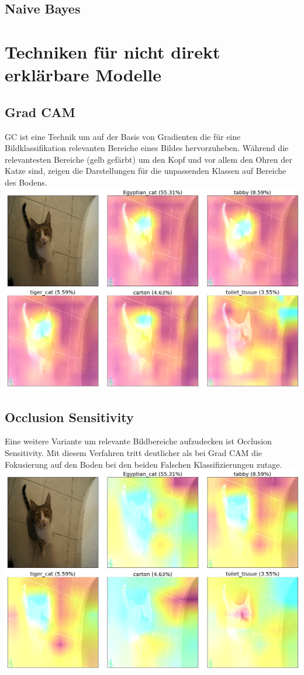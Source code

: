\documentclass[
  12pt, %
  a4paper, %
  oneside, %
  openany, 
  numbers=noenddot, %
  BCOR=5mm, %
  parskip=half*, %
  thesis, %
]{bfhbook}
\begin{document}
\subsection{Naive Bayes}

\section{Techniken für nicht direkt erklärbare Modelle}

\subsection{Grad CAM} \break
\Gls{GC} ist eine Technik \parencite{Selvaraju2016} um auf der Basis von Gradienten die für eine Bildklassifikation relevanten Bereiche eines Bildes hervorzuheben. Während die relevantesten Bereiche (gelb gefärbt) um den Kopf und vor allem den Ohren der Katze sind, zeigen die Darstellungen für die unpassenden Klassen auf Bereiche des Bodens.
\includegraphics[width=\textwidth]{Bilder/Grad-Cam-Classes.png}

\subsection{Occlusion Sensitivity} \break
Eine weitere Variante um relevante Bildbereiche aufzudecken ist Occlusion Sensitivity. Mit diesem Verfahren tritt deutlicher als bei Grad CAM die Fokusierung auf den Boden bei den beiden Falschen Klassifizierungen zutage.
\includegraphics[width=\textwidth]{Bilder/OcclusionSensitivity-Classes.png}
\end{document}
